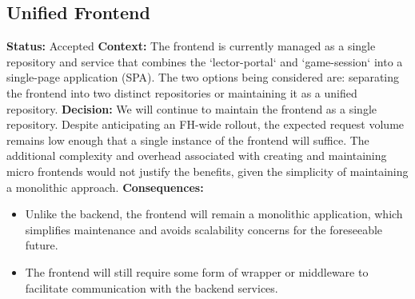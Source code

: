 \subsection{Unified Frontend}
\textbf{Status:} Accepted
\newline
\newline
\textbf{Context:}
The frontend is currently managed as a single repository and service that combines the `lector-portal` and `game-session` into a single-page application (SPA). The two options being considered are: separating the frontend into two distinct repositories or maintaining it as a unified repository.
\newline
\newline
\textbf{Decision:}
We will continue to maintain the frontend as a single repository.\newline
Despite anticipating an FH-wide rollout, the expected request volume remains low enough that a single instance of the frontend will suffice. The additional complexity and overhead associated with creating and maintaining micro frontends would not justify the benefits, given the simplicity of maintaining a monolithic approach.
\newline
\newline
\textbf{Consequences:}
\begin{itemize}
    \item Unlike the backend, the frontend will remain a monolithic application, which simplifies maintenance and avoids scalability concerns for the foreseeable future. 
    \item The frontend will still require some form of wrapper or middleware to facilitate communication with the backend services.
\end{itemize}